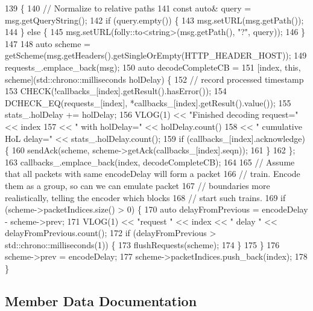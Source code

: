 \begin{DoxyCode}
139                                                                            \{
140   \textcolor{comment}{// Normalize to relative paths}
141   \textcolor{keyword}{const} \textcolor{keyword}{auto}& query = msg.getQueryString();
142   \textcolor{keywordflow}{if} (query.empty()) \{
143     msg.setURL(msg.getPath());
144   \} \textcolor{keywordflow}{else} \{
145     msg.setURL(folly::to<string>(msg.getPath(), \textcolor{stringliteral}{"?"}, query));
146   \}
147 
148   \textcolor{keyword}{auto} scheme = getScheme(msg.getHeaders().getSingleOrEmpty(HTTP\_HEADER\_HOST));
149   requests_.emplace\_back(msg);
150   \textcolor{keyword}{auto} decodeCompleteCB =
151       [index, \textcolor{keyword}{this}, scheme](std::chrono::milliseconds holDelay) \{
152         \textcolor{comment}{// record processed timestamp}
153         CHECK(!callbacks_[index].getResult().hasError());
154         DCHECK\_EQ(requests_[index], *callbacks_[index].getResult().value());
155         stats_.holDelay += holDelay;
156         VLOG(1) << \textcolor{stringliteral}{"Finished decoding request="} << index
157                 << \textcolor{stringliteral}{" with holDelay="} << holDelay.count()
158                 << \textcolor{stringliteral}{" cumulative HoL delay="} << stats_.holDelay.count();
159         \textcolor{keywordflow}{if} (callbacks_[index].acknowledge) \{
160           sendAck(scheme, scheme->getAck(callbacks_[index].seqn));
161         \}
162       \};
163   callbacks_.emplace\_back(index, decodeCompleteCB);
164 
165   \textcolor{comment}{// Assume that all packets with same encodeDelay will form a packet}
166   \textcolor{comment}{// train.  Encode them as a group, so can we can emulate packet}
167   \textcolor{comment}{// boundaries more realistically, telling the encoder which blocks}
168   \textcolor{comment}{// start such trains.}
169   \textcolor{keywordflow}{if} (scheme->packetIndices.size() > 0) \{
170     \textcolor{keyword}{auto} delayFromPrevious = encodeDelay - scheme->prev;
171     VLOG(1) << \textcolor{stringliteral}{"request "} << index << \textcolor{stringliteral}{" delay "} << delayFromPrevious.count();
172     \textcolor{keywordflow}{if} (delayFromPrevious > std::chrono::milliseconds(1)) \{
173       flushRequests(scheme);
174     \}
175   \}
176   scheme->prev = encodeDelay;
177   scheme->packetIndices.push\_back(index);
178 \}
\end{DoxyCode}


\subsection{Member Data Documentation}
